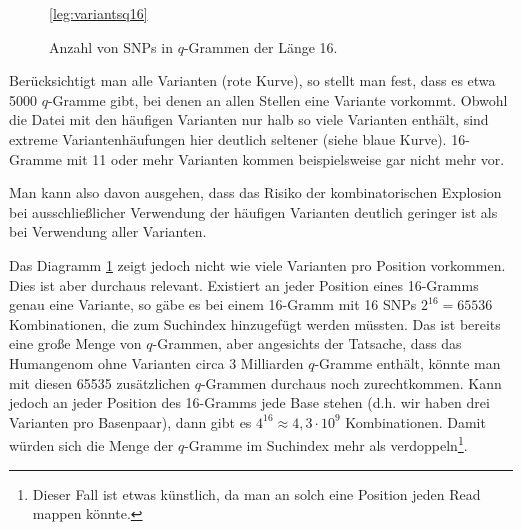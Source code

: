 \begin{figure}[h]
\pgfplotsset{footnotesize,width=12cm,compat=1.8}
\begin{center}
\ref*{leg:variantsq16}
\end{center}
\caption{Anzahl von SNPs in $q$-Grammen der Länge 16.}
\label{fig:stats:variantsq16}
\end{figure}

Berücksichtigt man alle Varianten (rote Kurve), so stellt man fest, dass es etwa 5000 $q$-Gramme gibt, bei denen an allen Stellen eine Variante vorkommt. Obwohl die Datei mit den häufigen Varianten nur halb so viele Varianten enthält, sind extreme Variantenhäufungen hier deutlich seltener (siehe blaue Kurve). 16-Gramme mit 11 oder mehr Varianten kommen beispielsweise gar nicht mehr vor.

Man kann also davon ausgehen, dass das Risiko der kombinatorischen Explosion bei ausschließlicher Verwendung der häufigen Varianten deutlich geringer ist als bei Verwendung aller Varianten. 

Das Diagramm \ref{fig:stats:variantsq16} zeigt jedoch nicht wie viele Varianten pro Position vorkommen. Dies ist aber durchaus relevant. Existiert an jeder Position eines 16-Gramms genau eine Variante, so gäbe es bei einem 16-Gramm mit 16 SNPs $2^{16} = 65536$ Kombinationen, die zum Suchindex hinzugefügt werden müssten. Das ist bereits eine große Menge von $q$-Grammen, aber angesichts der Tatsache, dass das Humangenom ohne Varianten circa 3 Milliarden $q$-Gramme enthält, könnte man mit diesen 65535 zusätzlichen $q$-Grammen durchaus noch zurechtkommen. Kann jedoch an jeder Position des 16-Gramms jede Base stehen (d.h. wir haben drei Varianten pro Basenpaar), dann gibt es $4^{16} \approx 4,3 \cdot 10^9$ Kombinationen. Damit würden sich die Menge der $q$-Gramme im Suchindex mehr als verdoppeln\footnote{Dieser Fall ist etwas künstlich, da man an solch eine Position jeden Read mappen könnte.}.

